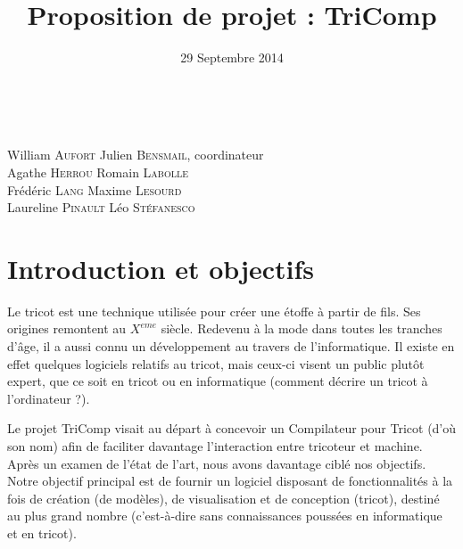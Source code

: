 \documentclass{article}
\title{Proposition de projet : TriComp}
\author{}
\date{29 Septembre 2014}
\begin{document}
\makeatletter %
  \begin{titlepage}
    \begin{center}
       {\LARGE \@title} \\
       \vspace{1cm}
       {\large \@date}
       \vspace{2cm}
    \end{center}
       {\large
       William \textsc{Aufort} \hfill Julien \textsc{Bensmail}, coordinateur\\
       Agathe \textsc{Herrou}  \hfill Romain \textsc{Labolle} \\
       Frédéric \textsc{Lang} \hfill Maxime \textsc{Lesourd} \\
       Laureline \textsc{Pinault} \hfill Léo \textsc{Stéfanesco}}
  \tableofcontents
  \end{titlepage}
\makeatother

\pagebreak

%



\section{Introduction et objectifs}

Le tricot est une technique utilisée pour créer une étoffe à partir de fils. Ses origines remontent au $X^{eme}$ siècle.
Redevenu à la mode dans toutes les tranches d'âge, il a aussi connu un développement au travers de l'informatique. Il existe en effet
quelques logiciels relatifs au tricot, mais ceux-ci visent un public plutôt expert, que ce soit en tricot ou en informatique (comment
décrire un tricot à l'ordinateur ?).

Le projet TriComp visait au départ à concevoir un Compilateur pour Tricot (d'où son nom) afin de faciliter davantage l'interaction entre
tricoteur et machine. Après un examen de l'état de l'art, nous avons davantage ciblé nos objectifs. Notre objectif principal est de
fournir un logiciel disposant de fonctionnalités à la fois de création (de modèles), de visualisation et de conception (tricot),
destiné au plus grand nombre (c'est-à-dire sans connaissances poussées en informatique et en tricot).
\end{document}
